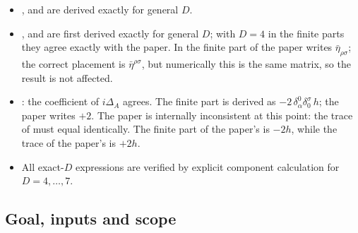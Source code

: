 \begin{discbox}
\begin{itemize}[leftmargin=1.2em,nosep]
\item {},  and  are derived exactly for general \(D\).
\item {},  and  are first derived exactly for general \(D\); with
\(D=4\) in the finite parts they agree exactly with the paper. In the finite part of
 the paper writes \(\bar\eta_{\rho\sigma}\); the correct placement is
\(\bar\eta^{\rho\sigma}\), but numerically this is the same matrix, so the result is not
affected.
\item {}: the coefficient of \(i\Delta_A\) agrees. The finite part is derived as
\(-2\,\delta^0_\alpha\delta^\sigma_0\,h\); the paper writes \(+2\). The paper is internally
inconsistent at this point: the trace of  must equal  identically. The
finite part of the paper's  is \(-2h\), while the trace of the paper's 
is \(+2h\).
\item All exact-\(D\) expressions are verified by explicit component calculation for
\(D=4,\ldots,7\).
\end{itemize}
\end{discbox}

\subsection{Goal, inputs and scope}

